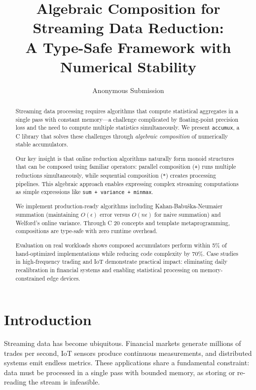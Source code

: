 \documentclass[sigconf]{acmart}
\newcommand{\accumux}{\texttt{accumux}\xspace}
\newcommand{\cpp}{C\nolinebreak\hspace{-.05em}\raisebox{.4ex}{\tiny\bf +}\nolinebreak\hspace{-.10em}\raisebox{.4ex}{\tiny\bf +}\xspace}
\begin{document}
\title{Algebraic Composition for Streaming Data Reduction:\\
A Type-Safe Framework with Numerical Stability}

\author{Anonymous Submission}

\begin{abstract}
Streaming data processing requires algorithms that compute statistical aggregates in a single pass with constant memory---a challenge complicated by floating-point precision loss and the need to compute multiple statistics simultaneously. We present \accumux, a \cpp library that solves these challenges through \emph{algebraic composition} of numerically stable accumulators.

Our key insight is that online reduction algorithms naturally form monoid structures that can be composed using familiar operators: parallel composition (\texttt{+}) runs multiple reductions simultaneously, while sequential composition (\texttt{*}) creates processing pipelines. This algebraic approach enables expressing complex streaming computations as simple expressions like \texttt{sum + variance + minmax}.

We implement production-ready algorithms including Kahan-Babuška-Neumaier summation (maintaining $O(\epsilon)$ error versus $O(n\epsilon)$ for naive summation) and Welford's online variance. Through \cpp20 concepts and template metaprogramming, compositions are type-safe with zero runtime overhead.

Evaluation on real workloads shows composed accumulators perform within 5\% of hand-optimized implementations while reducing code complexity by 70\%. Case studies in high-frequency trading and IoT demonstrate practical impact: eliminating daily recalibration in financial systems and enabling statistical processing on memory-constrained edge devices.
\end{abstract}

\maketitle

\section{Introduction}

Streaming data has become ubiquitous. Financial markets generate millions of trades per second, IoT sensors produce continuous measurements, and distributed systems emit endless metrics. These applications share a fundamental constraint: data must be processed in a single pass with bounded memory, as storing or re-reading the stream is infeasible.
\end{document}
